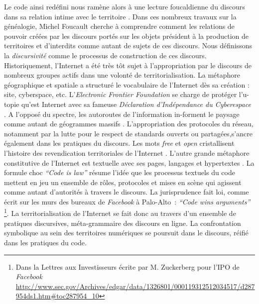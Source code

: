Le code ainsi redéfini nous ramène alors à une lecture foucaldienne du discours dans sa relation intime avec le territoire \citep{Foucault2004}. Dans ces nombreux travaux sur la généalogie, Michel Foucault cherche à comprendre comment les relations de pouvoir créées par les discours portés sur les objets président à la production de territoires et d’interdits comme autant de sujets de ces discours. Nous définissons la \textit{discursivité} comme le processus de construction de ces discours. Historiquement, l’Internet a été très tôt sujet à l’appropriation par le discours de nombreux groupes actifs dans une volonté de territorialisation. La métaphore géographique et spatiale a structuré le vocabulaire de l’Internet dès sa création \citep{Graham1998}: site, cyberspace, etc. L’\textit{Electronic Frontier Foundation} se charge de protéger l’u-topie qu’est Internet avec sa fameuse \textit{Déclaration d’Indépendance du Cyberespace} \citep{Barlow2001}. A l’opposé du spectre, les autoroutes de l’information in-forment le paysage comme autant de géogrammes massifs \citep{Berque1999}. L’appropriation des protocoles du réseau, notamment par la lutte pour le respect de standards ouverts ou partagées,s’ancre également dans les pratiques du discours. Les mots \textit{free} et \textit{open} cristallisent l’histoire des revendication territoriales de l’Internet \citep{Blondeau2000}. L’autre grande métaphore constitutive de l’Internet est textuelle avec ses pages, langages et hypertextes \citep{Vandendorpe1999}. La formule choc \textit{``Code is law''} \citep{Lessig2006} résume l’idée  que les processus textuels du code mettent en jeu un ensemble de rôles, protocoles et mises en scène qui agissent comme autant d’autorités à travers le discours. La jurisprudence fait loi, comme écrit sur les murs des bureaux de \textit{Facebook} à Palo-Alto : \textit{``Code wins arguments''} \footnote{Dans la Lettres aux Investisseurs écrite par M. Zuckerberg  pour l’IPO de \textit{Facebook} \url{http://www.sec.gov/Archives/edgar/data/1326801/000119312512034517/d287954ds1.htm\#toc287954_10}}. La territorialisation de l’Internet se fait donc au travers d’un ensemble de pratiques discursives, méta-grammaire des discours en ligne. La confrontation symbolique au sein des territoires numériques se poursuit dans le discours, réifié dans les pratiques du code.


